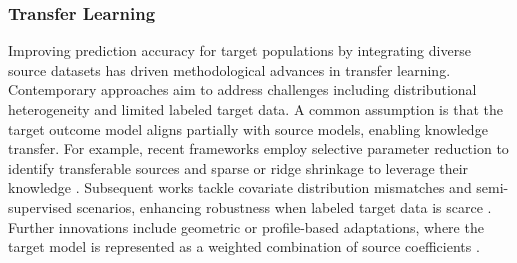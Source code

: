 \documentclass[12pt]{article}
\begin{document}
\subsubsection{Transfer Learning}\label{sec:review:tl}
Improving prediction accuracy for target populations by integrating diverse source datasets has driven methodological advances in transfer learning. Contemporary approaches aim to address challenges including distributional heterogeneity and limited labeled target data. A common assumption is that the target outcome model aligns partially with source models, enabling knowledge transfer. For example, recent frameworks employ selective parameter reduction to identify transferable sources and sparse or ridge shrinkage to leverage their knowledge \citep{bastani2020predicting,li2021translasso,tian2023transglm}. Subsequent works tackle covariate distribution mismatches and semi-supervised scenarios, enhancing robustness when labeled target data is scarce \citep{cai2022semi,he2024transfusion,zhou2024Model}. Further innovations include geometric or profile-based adaptations, where the target model is represented as a weighted combination of source coefficients \citep{gu2024angle-based,lin2024profiled}. 
\end{document}
